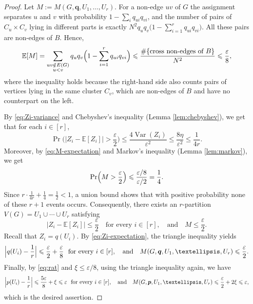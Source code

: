 \documentclass[10pt,a4paper]{amsart}
\newcommand{\EE}{\mathbb{E}}
\newcommand{\Var}{\operatorname{Var}}
\renewcommand{\le}{\leqslant}
\begin{document}
\begin{proof}
Let $M:=M(G,\bm q, U_1,\ldots,U_r)$. For a
non-edge $uv$ of $G$ the assignment separates $u$ and
$v$ with probability $1-\sum_{i}q_{ui}q_{vi}$, and the
number of pairs of $C_u\times C_v$ lying in different
parts is exactly
$N^2q_uq_v\bigl(1-\sum_{i=1}^r q_{ui}q_{vi}\bigr)$. 
 All these pairs are non-edges of $B$. Hence,
\begin{equation}\label{eq:M-expectation}
  \EE[M]=\sum_{\substack{uv\notin E(G)\\u<v}}
  q_uq_v\Bigl(1-\sum_{i=1}^rq_{ui}q_{vi}\Bigr)
  \le\frac{\#\{\text{cross non-edges of }B\}}{N^2}
  \le\frac{\varepsilon}{8},
\end{equation}
where the inequality holds because the right-hand side also counts pairs of vertices lying in the same cluster $C_v$, which are non-edges of $B$ and have no counterpart on the left. 

By \eqref{eq:Zi-variance} and Chebyshev's inequality (Lemma \ref{lem:chebyshev}), we get that for each $i\in[r]$, 
\[
  \Pr \bigg( \bigl\lvert Z_i-\EE[Z_i]\bigr\rvert
  >\frac{\varepsilon}{2}  \bigg)
  \le\frac{4\Var(Z_i)}{\varepsilon^2}
  \le\frac{8\eta}{\varepsilon^2} \le  \frac{1}{4r}.
\]
Moreover, by \eqref{eq:M-expectation} and Markov's inequality (Lemma \ref{lem:markov}), we get 
$$\Pr\Bigl(M>\frac{\varepsilon}{2}\Bigr)
\le\frac{\varepsilon/8}{\varepsilon/2}=\frac14.$$
Since $r\cdot\frac{1}{4r}+\frac14=\frac12<1$, a union
bound shows that with positive probability none of
these $r+1$ events occurs. Consequently, 
there exists an $r$-partition $V(G)=U_1\cup \cdots \cup U_r$ satisfying 
\[   \Big| Z_i - \mathbb{E}[Z_i]\Big| \le \frac{\varepsilon}{2} \quad 
\text{for every $i\in [r]$}, \quad \text{and} \quad M \le \frac{\varepsilon}{2}.  \]
Recall that $Z_i=q(U_i)$.  By \eqref{eq:Zi-expectation}, the triangle inequality yields 
\[
  \Bigl\lvert q(U_i)-\frac1r\Bigr\rvert
  \le\frac{\varepsilon}{2}+\frac{\varepsilon}{8}
  ~~ \text{for every}~i\in[r],
  \quad \text{and} \quad 
  M(G,\bm q, U_1,\ldots,U_r)\le\frac{\varepsilon}{2}.
\]
Finally, by \eqref{eq:rat} and $\xi\le\varepsilon/8$, using the triangle inequality again, we have 
\[
  \Bigl\lvert p(U_i)-\frac1r\Bigr\rvert
  \le\frac{5\varepsilon}{8}+\xi\le\varepsilon ~~
  \text{for every}~i\in[r], 
  \quad \text{and} \quad 
  M(G,\bm p, U_1,\ldots,U_r)
  \le\frac{\varepsilon}{2}+2\xi\le\varepsilon,
\]
which is the desired assertion.
\end{proof}
\end{document}
